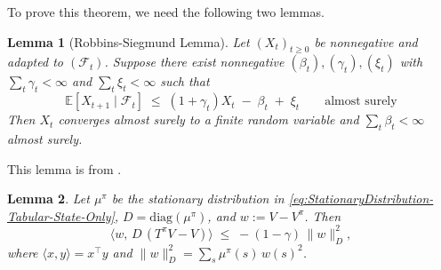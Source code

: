 \documentclass[
]{book}
\newtheorem{lemma}{Lemma}[chapter]
\theoremstyle{definition}
\theoremstyle{definition}
\theoremstyle{definition}
\theoremstyle{definition}
\theoremstyle{remark}
\begin{document}
To prove this theorem, we need the following two lemmas.

\begin{lemma}[Robbins-Siegmund Lemma]
\protect\hypertarget{lem:RobbinsSiegmund}{}\label{lem:RobbinsSiegmund}Let \((X_t)_{t\ge 0}\) be nonnegative and adapted to \((\mathcal F_t)\). Suppose there exist nonnegative \((\beta_t),(\gamma_t),(\xi_t)\) with \(\sum_t \gamma_t<\infty\) and \(\sum_t \xi_t<\infty\) such that
\[
\mathbb E[X_{t+1}\mid \mathcal F_t]\;\le\;(1+\gamma_t)X_t\;-\;\beta_t\;+\;\xi_t\qquad\text{almost surely}
\]
Then \(X_t\) converges almost surely to a finite random variable and \(\sum_t \beta_t<\infty\) almost surely.
\end{lemma}

This lemma is from \citep{robbins1971convergence}.

\begin{lemma}
\protect\hypertarget{lem:TDConvergenceLemma}{}\label{lem:TDConvergenceLemma}Let \(\mu^\pi\) be the stationary distribution in \eqref{eq:StationaryDistribution-Tabular-State-Only}, \(D=\mathrm{diag}(\mu^\pi)\), and \(w:=V-V^\pi\). Then
\[
\langle w,\,D\,(T^\pi V - V)\rangle\;\le\;-(1-\gamma)\,\|w\|_D^2,
\]
where \(\langle x,y\rangle=x^\top y\) and \(\|w\|_D^2=\sum_s \mu^\pi(s)\,w(s)^2\).
\end{lemma}
\end{document}
